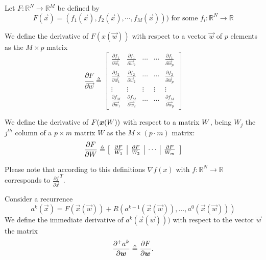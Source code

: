 
Let $F:\mathbb{R}^N \rightarrow \mathbb{R}^M$ be defined by
\begin{equation}
F(\vec{x}) = (f_1(\vec{x}),f_2(\vec{x}),\cdots,f_M(\vec{x}))) \text{    for some  } f_i:\mathbb{R}^N \rightarrow \mathbb{R}
\end{equation}

\begin{defn}
 We define the derivative of $F(x(\vec{w}))$ with respect to a vector $\vec{w}$ of $p$ elements as the $M \times p$ matrix
\begin{equation}
\frac{\partial F}{\partial \vec{w}} \triangleq
\begin{bmatrix}
   \frac{\partial f_1}{\partial \vec{w}_1}    & \frac{\partial f_1}{\partial \vec{w}_2}                & \cdots      & \cdots       & \frac{\partial f_1}{\partial \vec{w}_p}  \\
   \frac{\partial f_2}{\partial \vec{w}_1}    & \frac{\partial f_2}{\partial \vec{w}_2}                & \cdots      & \cdots       & \frac{\partial f_2}{\partial \vec{w}_p}  \\
   \vdots                & \vdots           & \vdots      & \vdots       &\vdots\\
   \frac{\partial f_M}{\partial \vec{w}_1}    & \frac{\partial f_M}{\partial \vec{w}_2}                & \cdots      & \cdots       & \frac{\partial f_M}{\partial \vec{w}_p}
\end{bmatrix}
\end{equation}
\end{defn}


\begin{defn}
We define the derivative of $F(\boldsymbol{x}(W))$ with respect to a matrix $W$, being $W_j$ the $j^{th}$ column of a 
$p\times m$ matrix $W$ as the $M\times (p \cdot m )$ matrix:
\begin{equation}
\frac{\partial F}{\partial W} \triangleq
\left[
\begin{array}{c|c|c|c}
\frac{\partial F}{W_1} & \frac{\partial F}{W_2} & \cdots & \frac{\partial F}{W_m} \\
\end{array}
\right]
\end{equation}
\end{defn}
Please note that according to this definitions $\nabla f(x)$ with $f:\mathbb{R}^N \rightarrow \mathbb{R}$ corresponds to $\frac{\partial f}{\partial\vec{x}}^T$.

\begin{defn}
Consider a recurrence 
$$a^k(\vec{x}) =F(\vec{x}(\vec{w})) +  R(a^{k-1}(\vec{x}(\vec{w})), \dots, a^0(\vec{x}(\vec{w})))$$
We define the immediate derivative of $a^k(\vec{x}(\vec{w})))$ with respect to the vector $\vec{w}$
the matrix 
\begin{equation}
	\frac{\partial^+ a^k}{\partial \boldsymbol{w}} \triangleq \frac{\partial F}{\partial \boldsymbol{w}}.
\end{equation}
\end{defn}


